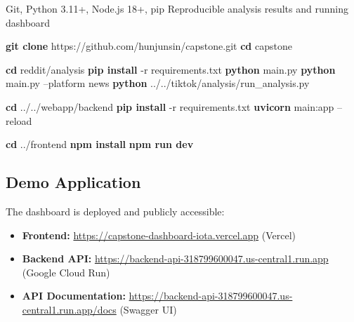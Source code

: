 \documentclass[12pt, letterpaper]{article}
\newenvironment{pseudoblock}[1]{%
  \begin{mdframed}[
    backgroundcolor=pseudobg,
    linecolor=pseudoframe,
    linewidth=1.5pt,
    frametitle={\color{pseudoframe}\bfseries\small Pseudo-code: #1},
    frametitlebackgroundcolor=pseudoframe!15
  ]
  \begin{algorithmic}[1]
}{%
  \end{algorithmic}
  \end{mdframed}
}
\begin{document}
\begin{pseudoblock}{Reproduction Procedure}
\REQUIRE Git, Python 3.11+, Node.js 18+, pip
\ENSURE Reproducible analysis results and running dashboard

\STATE \textbf{git clone} https://github.com/hunjunsin/capstone.git
\STATE \textbf{cd} capstone

\STATE {}
\STATE \textbf{cd} reddit/analysis
\STATE \textbf{pip install} -r requirements.txt
\STATE \textbf{python} main.py 
\STATE \textbf{python} main.py --platform news 
\STATE \textbf{python} ../../tiktok/analysis/run\_analysis.py 

\STATE {}
\STATE \textbf{cd} ../../webapp/backend
\STATE \textbf{pip install} -r requirements.txt
\STATE \textbf{uvicorn} main:app --reload 

\STATE {}
\STATE \textbf{cd} ../frontend
\STATE \textbf{npm install}
\STATE \textbf{npm run dev} 
\end{pseudoblock}

\subsection{Demo Application}

The dashboard is deployed and publicly accessible:

\begin{itemize}
  \item \textbf{Frontend:} \url{https://capstone-dashboard-iota.vercel.app} (Vercel)
  \item \textbf{Backend API:} \url{https://backend-api-318799600047.us-central1.run.app} (Google Cloud Run)
  \item \textbf{API Documentation:} \url{https://backend-api-318799600047.us-central1.run.app/docs} (Swagger UI)
\end{itemize}
\end{document}
